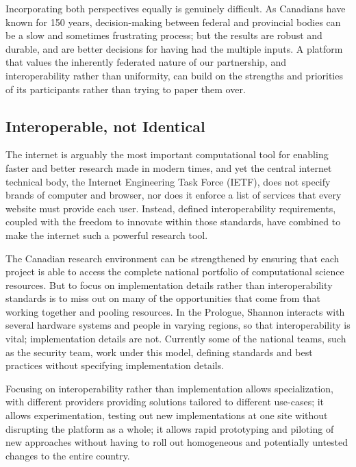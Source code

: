 \documentclass[11pt, letterpaper, twoside]{article}
\begin{document}
Incorporating both perspectives equally is genuinely difficult. As
Canadians have known for 150 years, decision-making between federal and
provincial bodies can be a slow and sometimes frustrating process; but
the results are robust and durable, and are better decisions for having
had the multiple inputs. A platform that values the inherently federated
nature of our partnership, and interoperability rather than uniformity,
can build on the strengths and priorities of its participants rather
than trying to paper them over.

\subsection*{Interoperable, not Identical}
%

The internet is arguably the most important computational tool for
enabling faster and better research made in modern times, and yet the
central internet technical body, the Internet Engineering Task Force
(IETF), does not specify brands of computer and browser, nor does it
enforce a list of services that every website must provide each user.
Instead, defined interoperability requirements, coupled with the freedom
to innovate within those standards, have combined to make the internet
such a powerful research tool.


The Canadian research environment can be strengthened by ensuring that
each project is able to access the complete national portfolio of
computational science resources. But to focus on implementation details
rather than interoperability standards is to miss out on many of the
opportunities that come from that working together and pooling
resources. In the Prologue, Shannon interacts with several hardware
systems and people in varying regions, so that interoperability is
vital; implementation details are not.  Currently some of the national
teams, such as the security team, work under this model, defining
standards and best practices without specifying implementation details.

Focusing on interoperability rather than implementation allows
specialization, with different providers providing solutions tailored to
different use-cases; it allows experimentation, testing out new
implementations at one site without disrupting the platform as a whole;
it allows rapid prototyping and piloting of new approaches without
having to roll out homogeneous and potentially untested changes to the
entire country.
\end{document}

